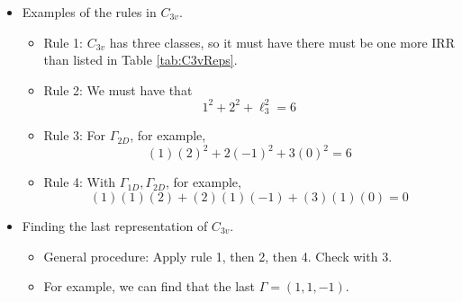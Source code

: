 \documentclass[../notes.tex]{subfiles}
\begin{document}
\begin{itemize}
\begin{enumerate}
\begin{equation*}
        \end{equation*}
    \end{enumerate}
    \item Examples of the rules in $C_{3v}$.
    \begin{itemize}
        \item Rule 1: $C_{3v}$ has three classes, so it must have there must be one more IRR than listed in Table \ref{tab:C3vReps}.
        \item Rule 2: We must have that
        \begin{equation*}
            1^2+2^2+\ell_3^2 = 6
        \end{equation*}
        \item Rule 3: For $\Gamma_{2D}$, for example,
        \begin{equation*}
            (1)(2)^2+2(-1)^2+3(0)^2 = 6
        \end{equation*}
        \item Rule 4: With $\Gamma_{1D},\Gamma_{2D}$, for example,
        \begin{equation*}
            (1)(1)(2)+(2)(1)(-1)+(3)(1)(0) = 0
        \end{equation*}
    \end{itemize}
    \item Finding the last representation of $C_{3v}$.
    \begin{itemize}
        \item General procedure: Apply rule 1, then 2, then 4. Check with 3.
        \item For example, we can find that the last $\Gamma=(1,1,-1)$.
    \end{itemize}
\end{itemize}
\end{document}
